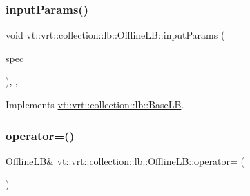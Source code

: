 \mbox{\label{structvt_1_1vrt_1_1collection_1_1lb_1_1_offline_l_b_a7d6ed6d7ec92fb86187715abacde2824}} 
\subsubsection{\texorpdfstring{input\+Params()}{inputParams()}}
{\footnotesize\ttfamily void vt\+::vrt\+::collection\+::lb\+::\+Offline\+L\+B\+::input\+Params (\begin{DoxyParamCaption}\item[{\hyperlink{structvt_1_1vrt_1_1collection_1_1balance_1_1_spec_entry}{balance\+::\+Spec\+Entry} $\ast$}]{spec }\end{DoxyParamCaption})\hspace{0.3cm}{\ttfamily [inline]}, {\ttfamily [override]}, {\ttfamily [virtual]}}



Implements \hyperlink{structvt_1_1vrt_1_1collection_1_1lb_1_1_base_l_b_a555e29aadfd428383464d6dd007506b6}{vt\+::vrt\+::collection\+::lb\+::\+Base\+LB}.

\mbox{\label{structvt_1_1vrt_1_1collection_1_1lb_1_1_offline_l_b_a94affec36f4542b31b67748b17f577bb}} 
\subsubsection{\texorpdfstring{operator=()}{operator=()}\hspace{0.1cm}{\footnotesize\ttfamily [1/2]}}
{\footnotesize\ttfamily \hyperlink{structvt_1_1vrt_1_1collection_1_1lb_1_1_offline_l_b}{Offline\+LB}\& vt\+::vrt\+::collection\+::lb\+::\+Offline\+L\+B\+::operator= (\begin{DoxyParamCaption}\item[{\hyperlink{structvt_1_1vrt_1_1collection_1_1lb_1_1_offline_l_b}{Offline\+LB} const \&}]{ }\end{DoxyParamCaption})\hspace{0.3cm}{\ttfamily [delete]}}

